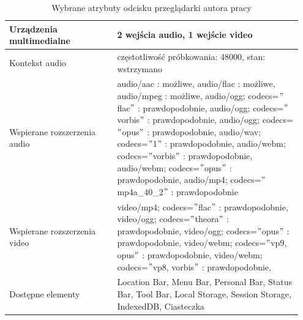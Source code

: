 \begin{table}[p]
\begin{tabular}{|p{0.35\linewidth} | p{0.6\linewidth}|}
        Urządzenia multimedialne     & 2 wejścia audio, 1 wejście video                                                                                                                                                                                                                                                                                                                                                                                                              \\ \hline
        Kontekst audio               & częstotliwość próbkowania: 48000, stan: wstrzymano                                                                                                                                                                                                                                                                                                                                                                                            \\ \hline
        Wspierane rozszerzenia audio & audio/aac : możliwe, audio/flac : możliwe, audio/mpeg : możliwe, audio/ogg; codecs=\("\)flac\("\)  : prawdopodobnie, audio/ogg; codecs=\("\)vorbis\("\) : prawdopodobnie, audio/ogg; codecs=\("\)opus\("\) : prawdopodobnie, audio/wav; codecs=\("\)1\("\) : prawdopodobnie, audio/webm; codecs=\("\)vorbis\("\) : prawdopodobnie, audio/webm; codecs=\("\)opus\("\) : prawdopodobnie, audio/mp4; codecs=\("\)mp4a\_40\_2\("\) : prawdopodobnie \\ \hline
        Wspierane rozszerzenia video & video/mp4; codecs=\("\)flac\("\) : prawdopodobnie, video/ogg; codecs=\("\)theora\("\) : prawdopodobnie, video/ogg; codecs=\("\)opus\("\) : prawdopodobnie, video/webm; codecs=\("\)vp9, opus\("\) : prawdopodobnie, video/webm; codecs=\("\)vp8, vorbis\("\) : prawdopodobnie,                                                                                                                                                                \\ \hline
        Dostępne elementy            & Location Bar, Menu Bar, Personal Bar, Status Bar, Tool Bar, Local Storage, Session Storage, IndexedDB, Ciasteczka                                                                                                                                                                                                                                                                                                                             \\ \hline
    \end{tabular}
    \caption{Wybrane atrybuty odcisku przeglądarki autora pracy\newline {}}
    \label{tab:http-js-attributes}
\end{table}

